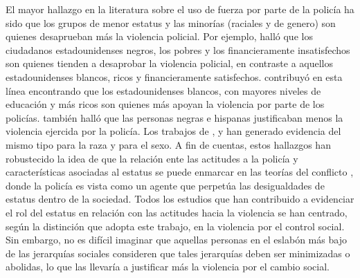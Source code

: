 \documentclass[12pt,twoside]{templates/facsothesis}
\begin{document}
El mayor hallazgo en la literatura sobre el uso de fuerza por parte de la policía ha sido que los grupos de menor estatus y las minorías (raciales y de genero) son quienes desaprueban más la violencia policial. Por ejemplo, \citet{Gamson1970} halló que los ciudadanos estadounidenses negros, los pobres y los financieramente insatisfechos son quienes tienden a desaprobar la violencia policial, en contraste a aquellos estadounidenses blancos, ricos y financieramente satisfechos. \citet{Arthur1994} contribuyó en esta línea encontrando que los estadounidenses blancos, con mayores niveles de educación y más ricos son quienes más apoyan la violencia por parte de los policías. \citet{Weitzer2002} también halló que las personas negras e hispanas justificaban menos la violencia ejercida por la policía. Los trabajos de \citet{Blumenthal1972}, \citet{Thompson2004} y \citet{Johnson2009} han generado evidencia del mismo tipo para la raza y para el sexo. A fin de cuentas, estos hallazgos han robustecido la idea de que la relación ente las actitudes a la policía y características asociadas al estatus se puede enmarcar en las teorías del conflicto \citep{Chambliss1995, Quinney1971, Turk1969}, donde la policía es vista como un agente que perpetúa las desigualdades de estatus dentro de la sociedad. Todos los estudios que han contribuido a evidenciar el rol del estatus en relación con las actitudes hacia la violencia se han centrado, según la distinción que adopta este trabajo, en la violencia por el control social. Sin embargo, no es difícil imaginar que aquellas personas en el eslabón más bajo de las jerarquías sociales consideren que tales jerarquías deben ser minimizadas o abolidas, lo que las llevaría a justificar más la violencia por el cambio social.
\end{document}
